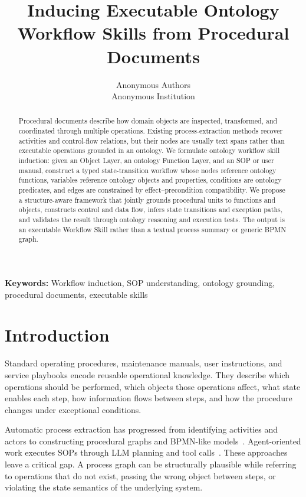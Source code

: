 \documentclass[10pt,twocolumn]{article}
\title{Inducing Executable Ontology Workflow Skills from Procedural Documents}
\author{Anonymous Authors\\Anonymous Institution}
\providecommand{\keywords}[1]{\par\smallskip\noindent\textbf{Keywords: }#1\par}
\begin{document}
\maketitle

\begin{abstract}
Procedural documents describe how domain objects are inspected, transformed, and coordinated through multiple operations. Existing process-extraction methods recover activities and control-flow relations, but their nodes are usually text spans rather than executable operations grounded in an ontology. We formulate ontology workflow skill induction: given an Object Layer, an ontology Function Layer, and an SOP or user manual, construct a typed state-transition workflow whose nodes reference ontology functions, variables reference ontology objects and properties, conditions are ontology predicates, and edges are constrained by effect--precondition compatibility. We propose a structure-aware framework that jointly grounds procedural units to functions and objects, constructs control and data flow, infers state transitions and exception paths, and validates the result through ontology reasoning and execution tests. The output is an executable Workflow Skill rather than a textual process summary or generic BPMN graph.
\end{abstract}

\keywords{Workflow induction, SOP understanding, ontology grounding, procedural documents, executable skills}

\section{Introduction}
Standard operating procedures, maintenance manuals, user instructions, and service playbooks encode reusable operational knowledge. They describe which operations should be performed, which objects those operations affect, what state enables each step, how information flows between steps, and how the procedure changes under exceptional conditions.

Automatic process extraction has progressed from identifying activities and actors to constructing procedural graphs and BPMN-like models~\cite{bellan2022pet,neuberger2024universal,du2024paged}. Agent-oriented work executes SOPs through LLM planning and tool calls~\cite{kulkarni2025agents,nandi2025sopbench}. These approaches leave a critical gap. A process graph can be structurally plausible while referring to operations that do not exist, passing the wrong object between steps, or violating the state semantics of the underlying system.
\end{document}
